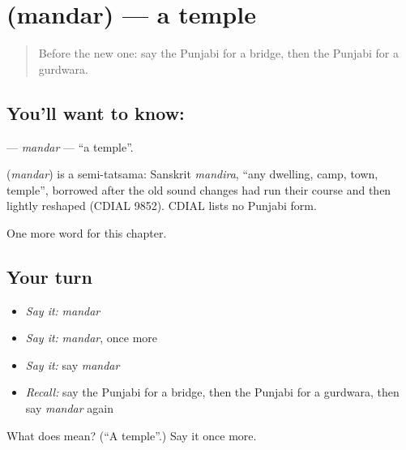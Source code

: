 \section[\texorpdfstring{\pa{ਮੰਦਰ} (mandar)}{ਮੰਦਰ (mandar)}]{ (mandar) — a temple}

\label{lesson:PA-C91-mandar}



\begin{quote}
Before the new one: say the Punjabi for a bridge, then the Punjabi for a gurdwara.
\end{quote}

\subsection*{You'll want to know: }
\textbf{} — \emph{mandar} — \textquotedblleft{}a temple\textquotedblright{}.

\begin{cousinweb}
\textbf{} (\emph{mandar}) is a semi-tatsama: Sanskrit \emph{mandira}, \textquotedblleft{}any dwelling, camp, town, temple\textquotedblright{}, borrowed after the old sound changes had run their course and then lightly reshaped (CDIAL 9852). CDIAL lists no Punjabi form.
\end{cousinweb}

\begin{grammarlens}[title={What you've built}]
One more word for this chapter.
\end{grammarlens}

\subsection*{Your turn}
\begin{itemize}
\raggedright
  \item \emph{Say it:} \emph{mandar}
  \item \emph{Say it:} \emph{mandar}, once more
  \item \emph{Say it:} say \emph{mandar}
  \item \emph{Recall:} say the Punjabi for a bridge, then the Punjabi for a gurdwara, then say \emph{mandar} again
\end{itemize}

\begin{tcolorbox}[breakable,colback=teal!4,colframe=teal!35!black,title={Before you move on}]
What does  mean? (\textquotedblleft{}A temple\textquotedblright{}.) Say it once more.
\end{tcolorbox}
